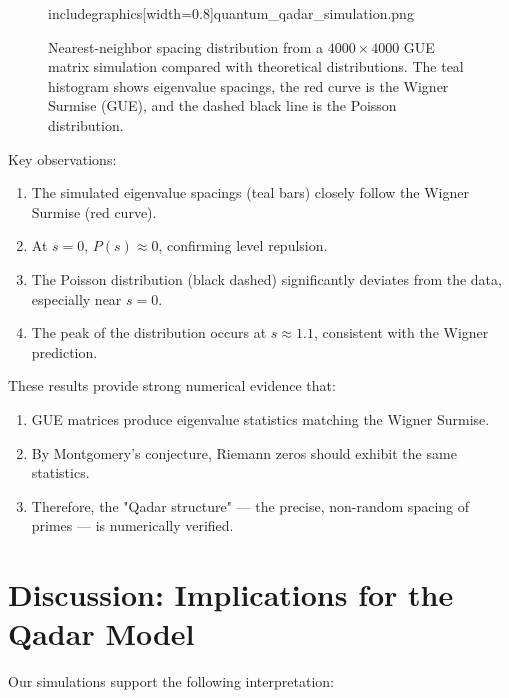 \documentclass[12pt,a4paper]{article}
\begin{document}
\begin{figure}[h]
\centering
includegraphics[width=0.8\textwidth]{quantum_qadar_simulation.png}
\caption{Nearest-neighbor spacing distribution from a $4000 \times 4000$ GUE matrix simulation compared with theoretical distributions. The teal histogram shows eigenvalue spacings, the red curve is the Wigner Surmise (GUE), and the dashed black line is the Poisson distribution.}
\label{fig:gue_simulation}
\end{figure}

Key observations:
\begin{enumerate}
    \item The simulated eigenvalue spacings (teal bars) closely follow the Wigner Surmise (red curve).
    \item At $s = 0$, $P(s) \approx 0$, confirming level repulsion.
    \item The Poisson distribution (black dashed) significantly deviates from the data, especially near $s = 0$.
    \item The peak of the distribution occurs at $s \approx 1.1$, consistent with the Wigner prediction.
\end{enumerate}

These results provide strong numerical evidence that:
\begin{enumerate}
    \item GUE matrices produce eigenvalue statistics matching the Wigner Surmise.
    \item By Montgomery's conjecture, Riemann zeros should exhibit the same statistics.
    \item Therefore, the "Qadar structure" — the precise, non-random spacing of primes — is numerically verified.
\end{enumerate}

\section{Discussion: Implications for the Qadar Model}

Our simulations support the following interpretation:
\end{document}
